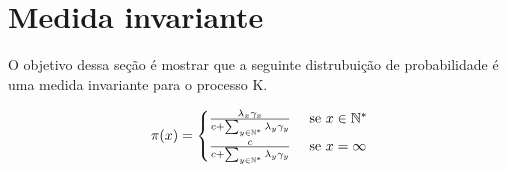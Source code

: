 
\section{Medida invariante}
\label{sec:invariante}

O objetivo dessa seção é mostrar que a seguinte distrubuição de
probabilidade é uma medida invariante para o processo K.

\begin{equation}
  \label{eq:invariante}
  \pi(x) = \begin{cases}
    \frac{\lambda_x \gamma_x}{c + \sum_{y \in {\mathbb{N^*}}} \lambda_y \gamma_y}
    & \textrm{ se } x \in {\mathbb{N^*}} \\
    \frac{c}{c + \sum_{y \in {\mathbb{N^*}}} \lambda_y \gamma_y}
    & \textrm{ se } x = \infty \\
  \end{cases}
\end{equation}

